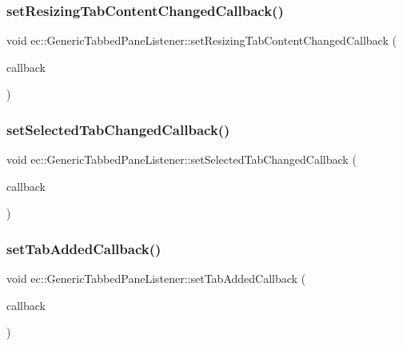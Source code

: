 \subsubsection{\texorpdfstring{set\+Resizing\+Tab\+Content\+Changed\+Callback()}{setResizingTabContentChangedCallback()}}
{\footnotesize\ttfamily void ec\+::\+Generic\+Tabbed\+Pane\+Listener\+::set\+Resizing\+Tab\+Content\+Changed\+Callback (\begin{DoxyParamCaption}\item[{const \mbox{\hyperlink{classec_1_1_generic_tabbed_pane_listener_a41097f0918f8888f9e970e9c9a5f0d52}{Resizing\+Tab\+Content\+Changed\+\_\+\+Callback}} \&}]{callback }\end{DoxyParamCaption})}

\mbox{\label{classec_1_1_generic_tabbed_pane_listener_ad74c260a9808fff690dbae8e21075492}} 
\subsubsection{\texorpdfstring{set\+Selected\+Tab\+Changed\+Callback()}{setSelectedTabChangedCallback()}}
{\footnotesize\ttfamily void ec\+::\+Generic\+Tabbed\+Pane\+Listener\+::set\+Selected\+Tab\+Changed\+Callback (\begin{DoxyParamCaption}\item[{const \mbox{\hyperlink{classec_1_1_generic_tabbed_pane_listener_adbb9c0a73499ce6b26ba1c8569cb8525}{Selected\+Tab\+Changed\+\_\+\+Callback}} \&}]{callback }\end{DoxyParamCaption})}

\mbox{\label{classec_1_1_generic_tabbed_pane_listener_a8dbe036522e0fef51b5617a396725592}} 
\subsubsection{\texorpdfstring{set\+Tab\+Added\+Callback()}{setTabAddedCallback()}}
{\footnotesize\ttfamily void ec\+::\+Generic\+Tabbed\+Pane\+Listener\+::set\+Tab\+Added\+Callback (\begin{DoxyParamCaption}\item[{const \mbox{\hyperlink{classec_1_1_generic_tabbed_pane_listener_aef726cc6897d8994602cb127693e664d}{Tab\+Added\+\_\+\+Callback}} \&}]{callback }\end{DoxyParamCaption})}

